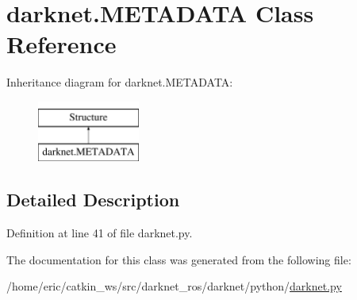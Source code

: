 \hypertarget{classdarknet_1_1METADATA}{}\section{darknet.\+M\+E\+T\+A\+D\+A\+TA Class Reference}
\label{classdarknet_1_1METADATA}
Inheritance diagram for darknet.\+M\+E\+T\+A\+D\+A\+TA\+:\begin{figure}[H]
\begin{center}
\leavevmode
\includegraphics[height=2.000000cm]{classdarknet_1_1METADATA}
\end{center}
\end{figure}


\subsection{Detailed Description}


Definition at line 41 of file darknet.\+py.



The documentation for this class was generated from the following file\+:\begin{DoxyCompactItemize}
\item 
/home/eric/catkin\+\_\+ws/src/darknet\+\_\+ros/darknet/python/\mbox{\hyperlink{darknet_8py}{darknet.\+py}}\end{DoxyCompactItemize}
